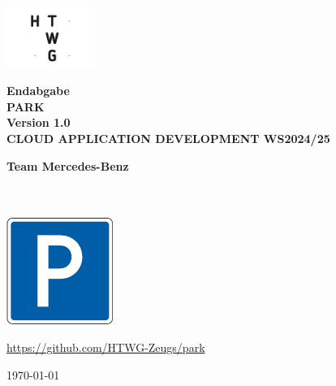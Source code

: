 \begin{titlepage}
    \begin{center}
        \vspace{0.5cm}
        
        \includegraphics[height=2cm]{resources/htwg-logo.png}
        
        \vspace{1.5cm}

        \Huge{\textbf{Endabgabe\\}}
        \vspace{0.5cm}
        \Huge{\textbf{PARK \\ Version 1.0 \\}}
        \vspace{0.5cm}
        \Huge{\textbf{CLOUD APPLICATION DEVELOPMENT WS2024/25}}
    
        \vspace{1.5cm}
 
        \Large{
            \textbf{Team Mercedes-Benz} \\
            \href{mailto:lukas.benner@htwg-konstanz.de}{\authorlukasb} \\
            \href{mailto:jonas.elsper@htwg-konstanz.de}{\authorjonas} \\
            \href{mailto:lukas.epple@htwg-konstanz.de}{\authorlukase}
        }
 
        \vspace{1.5cm}
        
        \includegraphics[height=3.5cm]{resources/logo.png}

        \vspace{1.5cm}

        \Large{
            \url{https://github.com/HTWG-Zeugs/park}
        }
        \vspace{1.5cm}

        \large{\today}
      
    \end{center}
 \end{titlepage}

\newpage
